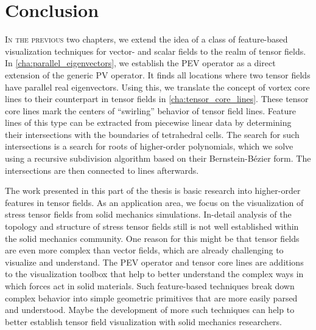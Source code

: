 \chapter{Conclusion} %
\label{cha:tensor_vis_conclusions}
%
\lettrine[lhang=0.06, loversize=-0.015, findent=-1pt]{I}{n the previous} two
chapters, we extend the idea of a class of feature-based visualization
techniques for vector- and scalar fields to the realm of tensor fields.
%
In \cref{cha:parallel_eigenvectors}, we establish the \ac{PEV} operator as a
direct extension of the generic \ac{PV} operator.
%
It finds all locations where two tensor fields have parallel real eigenvectors.
%
Using this, we translate the concept of vortex core lines to their counterpart
in tensor fields in \cref{cha:tensor_core_lines}.
%
These tensor core lines mark the centers of ``swirling'' behavior of tensor
field lines.
%
Feature lines of this type can be extracted from piecewise linear data by
determining their intersections with the boundaries of tetrahedral cells.
%
The search for such intersections is a search for roots of higher-order
polynomials, which we solve using a recursive subdivision algorithm based on
their Bernstein-B\'ezier form.
%
The intersections are then connected to lines afterwards.
%

%
The work presented in this part of the thesis is basic research into
higher-order features in tensor fields.
%
As an application area, we focus on the visualization of stress tensor fields
from solid mechanics simulations.
%
In-detail analysis of the topology and structure of stress tensor fields still
is not well established within the solid mechanics community.
%
One reason for this might be that tensor fields are even more complex than
vector fields, which are already challenging to visualize and understand.
%
The \ac{PEV} operator and tensor core lines are additions to the visualization
toolbox that help to better understand the complex ways in which forces act in
solid materials.
%
Such feature-based techniques break down complex behavior into simple geometric
primitives that are more easily parsed and understood.
%
Maybe the development of more such techniques can help to better establish
tensor field visualization with solid mechanics researchers.
%
